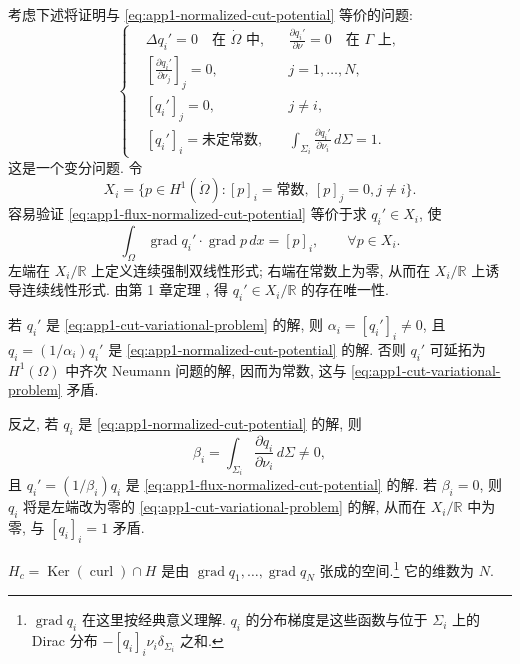 \begin{Proof}
考虑下述将证明与 \eqref{eq:app1-normalized-cut-potential} 等价的问题:
\begin{equation}
\left\{
\begin{aligned}
&\Delta q_i'=0\quad\text{在 }\dot\Omega\text{ 中},
&&\frac{\partial q_i'}{\partial\nu}=0\quad\text{在 }\Gamma\text{ 上},\\
&\left[\frac{\partial q_i'}{\partial\nu_j}\right]_j=0,
&&j=1,\ldots,N,\\
&[q_i']_j=0,
&&j\neq i,\\
&[q_i']_i=\text{未定常数},
&&\int_{\Sigma_i}\frac{\partial q_i'}{\partial\nu_i}\,d\Sigma=1.
\end{aligned}
\right.
\label{eq:app1-flux-normalized-cut-potential}
\end{equation}
这是一个变分问题. 令
\[
X_i=\{p\in H^1(\dot\Omega):[p]_i=\text{常数},
\ [p]_j=0, j\neq i\}.
\]
容易验证 \eqref{eq:app1-flux-normalized-cut-potential} 等价于求 $q_i'\in X_i$, 使
\begin{equation}
\int_\Omega\operatorname{grad}q_i'\cdot\operatorname{grad}p\,dx
=[p]_i,
\qquad\forall p\in X_i.
\label{eq:app1-cut-variational-problem}
\end{equation}
左端在 $X_i/\mathbb R$ 上定义连续强制双线性形式; 右端在常数上为零, 从而在 $X_i/\mathbb R$ 上诱导连续线性形式. 由第 1 章定理 , 得 $q_i'\in X_i/\mathbb R$ 的存在唯一性.

若 $q_i'$ 是 \eqref{eq:app1-cut-variational-problem} 的解, 则 $\alpha_i=[q_i']_i\neq0$, 且 $q_i=(1/\alpha_i)q_i'$ 是 \eqref{eq:app1-normalized-cut-potential} 的解. 否则 $q_i'$ 可延拓为 $H^1(\Omega)$ 中齐次 Neumann 问题的解, 因而为常数, 这与 \eqref{eq:app1-cut-variational-problem} 矛盾.

\hypertarget{appendix-01-page-329}{}
反之, 若 $q_i$ 是 \eqref{eq:app1-normalized-cut-potential} 的解, 则
\[
\beta_i=\int_{\Sigma_i}\frac{\partial q_i}{\partial\nu_i}\,d\Sigma\neq0,
\]
且 $q_i'=(1/\beta_i)q_i$ 是 \eqref{eq:app1-flux-normalized-cut-potential} 的解. 若 $\beta_i=0$, 则 $q_i$ 将是左端改为零的 \eqref{eq:app1-cut-variational-problem} 的解, 从而在 $X_i/\mathbb R$ 中为零, 与 $[q_i]_i=1$ 矛盾.
\end{Proof}

\begin{Lemma}
\label{lem:app1-kernel-basis}
$H_c=\operatorname{Ker}(\operatorname{curl})\cap H$ 是由 $\operatorname{grad}q_1,\ldots,\operatorname{grad}q_N$ 张成的空间.\footnote{$\operatorname{grad}q_i$ 在这里按经典意义理解. $q_i$ 的分布梯度是这些函数与位于 $\Sigma_i$ 上的 Dirac 分布 $-[q_i]_i\nu_i\delta_{\Sigma_i}$ 之和.} 它的维数为 $N$.
\end{Lemma}

